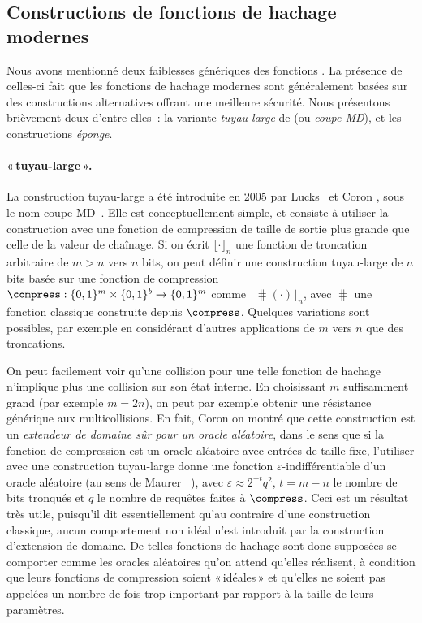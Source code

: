 \subsection{Constructions de fonctions de hachage modernes}
\label{sec:fbetter}

Nous avons mentionné deux faiblesses génériques des fonctions \merkdam. La présence de celles-ci fait que les fonctions de hachage modernes sont généralement
basées sur des constructions alternatives offrant une meilleure sécurité. Nous présentons brièvement deux d'entre elles~: la
variante \emph{tuyau-large} de \merkdam (ou \emph{coupe-MD}), et les constructions \emph{éponge}. 


\paragraph{\merkdam «\,tuyau-large\,».}
La construction tuyau-large a été introduite en 2005 par Lucks~\cite{DBLP:conf/asiacrypt/Lucks05}
et Coron \etal, sous le nom coupe-MD~\cite{DBLP:conf/crypto/CoronDMP05}.
Elle est conceptuellement simple, et consiste à utiliser la construction \merkdam avec une fonction de compression de taille de sortie plus grande que celle de la valeur de chaînage.
Si on écrit
$\lfloor\cdot\rfloor_n$
une fonction de troncation arbitraire de $m > n$ vers $n$ bits, on peut définir
une construction tuyau-large de $n$ bits basée sur une fonction de compression $\compress : \{0,1\}^m \times \{0,1\}^b \rightarrow \{0,1\}^m$
comme $\lfloor\hash(\cdot)\rfloor_n$, avec $\hash$ une fonction \merkdam classique construite depuis $\compress$.
Quelques variations sont possibles, par exemple en considérant d'autres applications de $m$ vers $n$ que des troncations.

On peut facilement voir qu'une collision pour une telle fonction de hachage n'implique plus une collision sur son état interne.
En choisissant $m$ suffisamment grand (par exemple $m = 2n$),
on peut par exemple obtenir une résistance générique aux multicollisions. En fait,
Coron \etal on montré que cette construction est un \emph{extendeur de domaine sûr pour un oracle aléatoire}, dans le sens
que si la fonction de compression est un oracle aléatoire avec entrées de taille fixe, l'utiliser avec une construction tuyau-large donne une fonction
$\varepsilon$-indifférentiable d'un oracle aléatoire
(au sens de Maurer \etal~\cite{DBLP:conf/tcc/MaurerRH04}), avec
$\varepsilon \approx 2^{-t}q^2$, $t = m - n$ le nombre de bits tronqués et $q$ le nombre de requêtes faites à $\compress$.
Ceci est un résultat très utile, puisqu'il dit essentiellement qu'au contraire d'une construction \merkdam classique, aucun comportement non idéal
n'est introduit par la construction d'extension de domaine. De telles fonctions de hachage sont donc supposées se comporter comme les oracles aléatoires
qu'on attend qu'elles réalisent, à condition que leurs fonctions de compression soient «\,idéales\,» et qu'elles ne soient
pas appelées un nombre de fois trop important par rapport à la taille de leurs paramètres.


